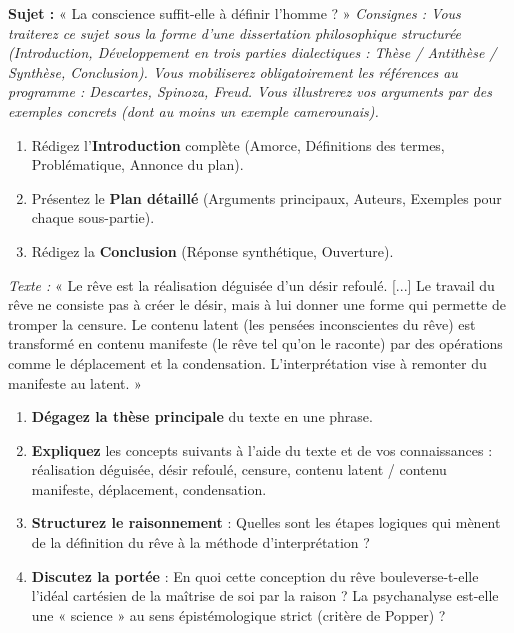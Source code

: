\documentclass[11pt]{article}
\newcommand{\cle}[1]{{\popxbold\color{popdark}#1}}
\newcounter{popsec}
\newcounter{popsub}
\newcommand{\courssub}[1]{%
  \stepcounter{popsub}%
  \par\vspace{9pt}\noindent{\popxbold\fontsize{11.5}{13}\selectfont\color{popink}{\color{poporange}\thepopsec.\thepopsub}\hspace{6pt}#1}\par\nopagebreak\vspace{4pt}
}
\begin{document}
\courssub{Je me prépare au Bac}

\begin{exercice}
\textbf{Sujet :} « La conscience suffit-elle à définir l'homme ? »
\emph{Consignes : Vous traiterez ce sujet sous la forme d'une dissertation philosophique structurée (Introduction, Développement en trois parties dialectiques : Thèse / Antithèse / Synthèse, Conclusion). Vous mobiliserez obligatoirement les références au programme : Descartes, Spinoza, Freud. Vous illustrerez vos arguments par des exemples concrets (dont au moins un exemple camerounais).}
\begin{enumerate}
\item Rédigez l'\textbf{Introduction} complète (Amorce, Définitions des termes, Problématique, Annonce du plan).
\item Présentez le \textbf{Plan détaillé} (Arguments principaux, Auteurs, Exemples pour chaque sous-partie).
\item Rédigez la \textbf{Conclusion} (Réponse synthétique, Ouverture).
\end{enumerate}
\end{exercice}

\begin{exercice}
\emph{Texte :} « Le rêve est la réalisation déguisée d'un désir refoulé. [...] Le travail du rêve ne consiste pas à créer le désir, mais à lui donner une forme qui permette de tromper la censure. Le contenu latent (les pensées inconscientes du rêve) est transformé en contenu manifeste (le rêve tel qu'on le raconte) par des opérations comme le déplacement et la condensation. L'interprétation vise à remonter du manifeste au latent. »
\begin{enumerate}
\item \textbf{Dégagez la thèse principale} du texte en une phrase.
\item \textbf{Expliquez} les concepts suivants à l'aide du texte et de vos connaissances : \cle{réalisation déguisée}, \cle{désir refoulé}, \cle{censure}, \cle{contenu latent / contenu manifeste}, \cle{déplacement}, \cle{condensation}.
\item \textbf{Structurez le raisonnement} : Quelles sont les étapes logiques qui mènent de la définition du rêve à la méthode d'interprétation ?
\item \textbf{Discutez la portée} : En quoi cette conception du rêve bouleverse-t-elle l'idéal cartésien de la maîtrise de soi par la raison ? La psychanalyse est-elle une « science » au sens épistémologique strict (critère de Popper) ?
\end{enumerate}
\end{exercice}
\end{document}
